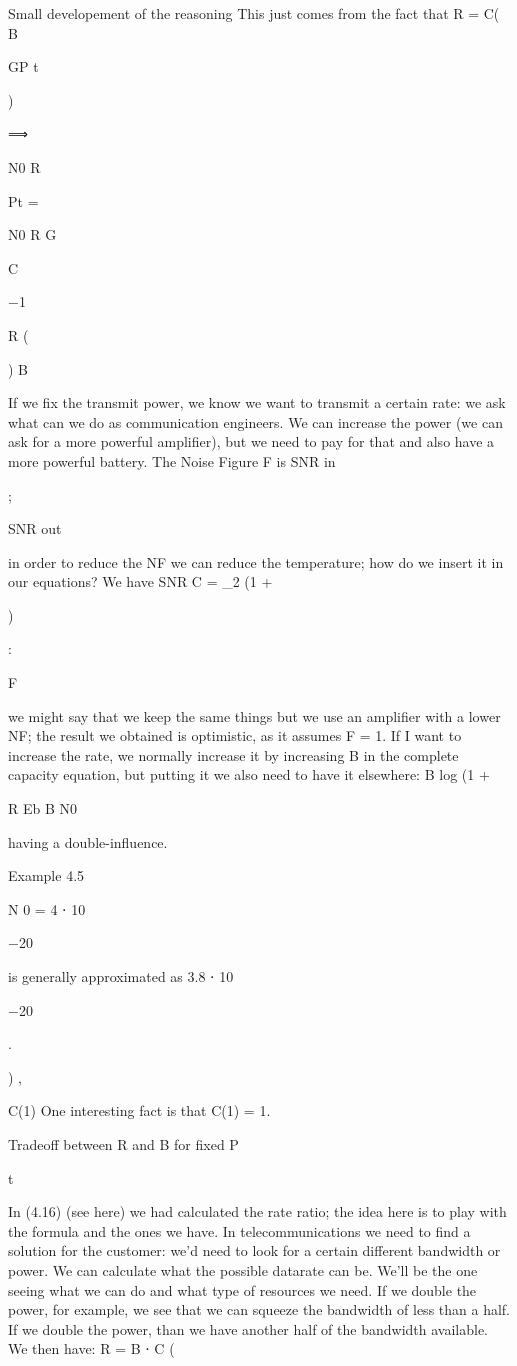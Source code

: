 {{{{{​Small developement of the reasoning This just comes from the fact that R
= C(
B

GP t

)

⟹

N0 R

Pt =

N0 R G

C

−1

R
(

)
B

If we fix the transmit power, we know we want to transmit a certain rate: we ask what can we do as communication engineers. We can increase the power (we can ask for a more powerful amplifier), but we need to pay for that and also have a more powerful battery.
The Noise Figure F is SNR in

;

SNR out

in order to reduce the NF we can reduce the temperature; how do we insert it in our equations? We have SNR C = \log_2 (1 +

)

:

F

we might say that we keep the same things but we use an amplifier with a lower NF; the result we obtained is optimistic, as it assumes F = 1.
If I want to increase the rate, we normally increase it by increasing B in the complete capacity equation, but putting it we also need to have it elsewhere:
B log (1 +

R Eb B N0

having a double-influence.

Example 4.5

N 0 = 4 ⋅ 10

−20

is generally approximated as 3.8 ⋅ 10

−20

.

) ,

​C(1)
One interesting fact is that C(1) = 1.

Tradeoff between R and B for fixed P

t

In (4.16) (see here) we had calculated the rate ratio; the idea here is to play with the formula and the ones we have.
In telecommunications we need to find a solution for the customer: we'd need to look for a certain different bandwidth or power.
We can calculate what the possible datarate can be. We'll be the one seeing what we can do and what type of resources we need.
If we double the power, for example, we see that we can squeeze the bandwidth of less than a half. If we double the power, than we have another half of the bandwidth available. We then have:
R = B ⋅ C (

}}}}}
